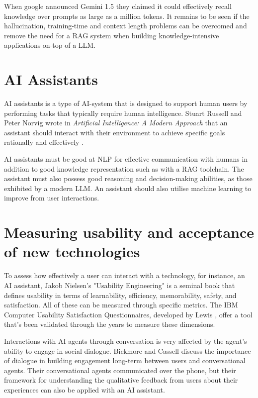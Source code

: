When google announced Gemini 1.5 \cite{gemini_team_gemini_2024} they claimed it could effectively recall knowledge over prompts as large as a million tokens. It remains to be seen if the hallucination, training-time and context length problems can be overcomed and remove the need for a \gls{RAG} system when building knowledge-intensive applications on-top of a \gls{LLM}.


\section{AI Assistants}


AI assistants is a type of AI-system that is designed to support human users by performing tasks that typically require human intelligence. Stuart Russell and Peter Norvig wrote in \textit{Artificial Intelligence: A Modern Approach} that an assistant should interact with their environment to achieve specific goals rationally and effectively \cite{russell_artificial_2016}.


AI assistants must be good at \gls{NLP} for effective communication with humans in addition to good knowledge representation such as with a \gls{RAG} toolchain. The assistant must also possess good reasoning and decision-making abilities, as those exhibited by a modern \gls{LLM}. An assistant should also utilise machine learning to improve from user interactions.


\section{Measuring usability and acceptance of new technologies}


To assess how effectively a user can interact with a technology, for instance, an AI assistant, Jakob Nielsen's "Usability Engineering" \cite{nielsen_chapter_1993-1} is a seminal book that defines usability in terms of learnability, efficiency, memorability, safety, and satisfaction. All of these can be measured through specific metrics. The IBM Computer Usability Satisfaction Questionnaires, developed by Lewis \cite{lewis_ibm_1995}, offer a tool that’s been validated through the years to measure these dimensions.


Interactions with AI agents through conversation is very affected by the agent's ability to engage in social dialogue. Bickmore and Cassell \cite{bickmore_social_2005} discuss the importance of dialogue in building engagement long-term between users and conversational agents. Their conversational agents communicated over the phone, but their framework for understanding the qualitative feedback from users about their experiences can also be applied with an AI assistant.


